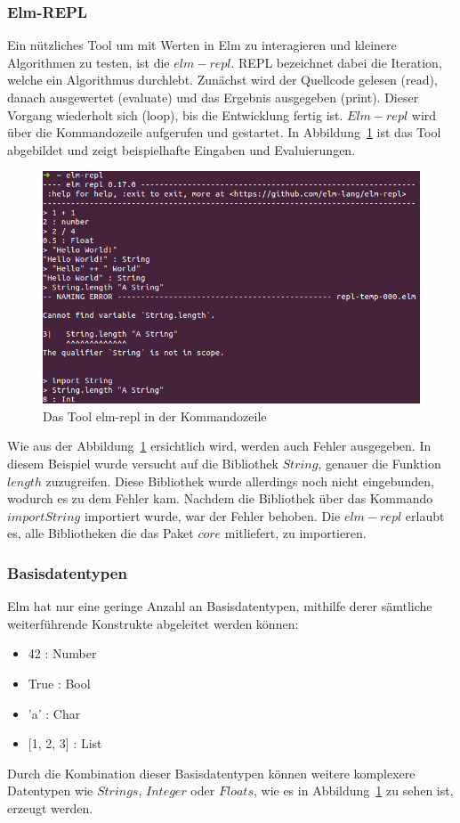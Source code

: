 \subsubsection{Elm-REPL}
\label{sec:elm-repl}
Ein nützliches Tool um mit Werten in Elm zu interagieren und kleinere Algorithmen zu testen, ist die $elm-repl$. \ac{REPL} bezeichnet dabei die Iteration, welche ein Algorithmus durchlebt. Zunächst wird der Quellcode gelesen (read), danach ausgewertet (evaluate) und das Ergebnis ausgegeben (print). Dieser Vorgang wiederholt sich (loop), bis die Entwicklung fertig ist. $Elm-repl$ wird über die Kommandozeile aufgerufen und gestartet. In Abbildung~\ref{fig:elm-repl} ist das Tool abgebildet und zeigt beispielhafte Eingaben und Evaluierungen.
\begin{figure}[h]
\centering
\includegraphics[scale=0.5]{img/elm-repl.png}
\caption{Das Tool elm-repl in der Kommandozeile}\label{fig:elm-repl}
\end{figure}
Wie aus der Abbildung~\ref{fig:elm-repl} ersichtlich wird, werden auch Fehler ausgegeben. In diesem Beispiel wurde versucht auf die Bibliothek $String$, genauer die Funktion $length$ zuzugreifen. Diese Bibliothek wurde allerdings noch nicht eingebunden, wodurch es zu dem Fehler kam. Nachdem die Bibliothek über das Kommando $import String$ importiert wurde, war der Fehler behoben. Die $elm-repl$ erlaubt es, alle Bibliotheken die das Paket $core$ mitliefert, zu importieren.

\subsubsection{Basisdatentypen}
\label{sec:Basisdatentypen}
Elm hat nur eine geringe Anzahl an Basisdatentypen, mithilfe derer sämtliche weiterführende Konstrukte abgeleitet werden können:
\begin{itemize}
	\item 42 : Number
	\item True : Bool
	\item 'a' : Char
	\item {[1, 2, 3] : List}
\end{itemize}
Durch die Kombination dieser Basisdatentypen können weitere komplexere Datentypen wie $Strings$, $Integer$ oder $Floats$, wie es in Abbildung~\ref{fig:elm-repl} zu sehen ist, erzeugt werden.

